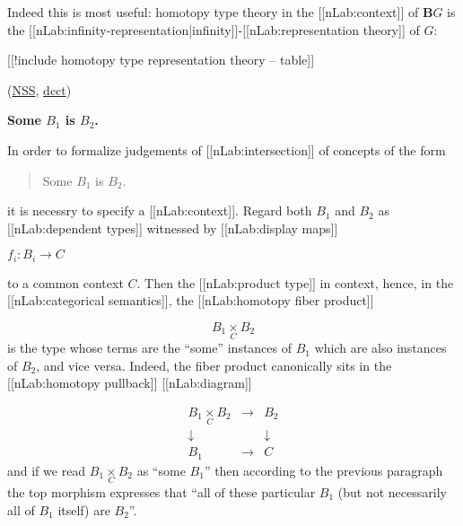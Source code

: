 \documentclass[12pt,titlepage]{article}
\newcommand{\itexarray}[1]{\begin{matrix}#1\end{matrix}}
\theoremstyle{plain}
\theoremstyle{definition}
\theoremstyle{remark}
\begin{document}
Indeed this is most useful: homotopy type theory in the [[nLab:context]] of $\mathbf{B}G$ is the [[nLab:infinity-representation|infinity]]-[[nLab:representation theory]] of $G$:

[[!include homotopy type representation theory -- table]]

(\hyperlink{NSS}{NSS}, \hyperlink{dcct}{dcct})

\textbf{Some $B_1$ is $B_2$.}

In order to formalize judgements of [[nLab:intersection]] of concepts of the form

\begin{quote}%
Some $B_1$ is $B_2$.


\end{quote}
it is necessry to specify a [[nLab:context]]. Regard both $B_1$ and $B_2$ as [[nLab:dependent types]] witnessed by [[nLab:display maps]]

$f_i \colon B_i \longrightarrow C$

to a common context $C$. Then the [[nLab:product type]] in context, hence, in the [[nLab:categorical semantics]], the [[nLab:homotopy fiber product]]

\begin{displaymath}
B_1 \underset{C}{\times} B_2
\end{displaymath}
is the type whose terms are the ``some'' instances of $B_1$ which are also instances of $B_2$, and vice versa. Indeed, the fiber product canonically sits in the [[nLab:homotopy pullback]] [[nLab:diagram]]

\begin{displaymath}
\itexarray{
    B_1 \underset{C}{\times} B_2
    &\longrightarrow&
    B_2
    \\
    \downarrow && \downarrow
    \\
    B_1 &\longrightarrow& C
  }
\end{displaymath}
and if we read $B_1 \underset{C}{\times} B_2$ as ``some $B_1$'' then according to the previous paragraph the top morphism expresses that ``all of these particular $B_1$ (but not necessarily all of $B_1$ itself) are $B_2$''.
\end{document}
